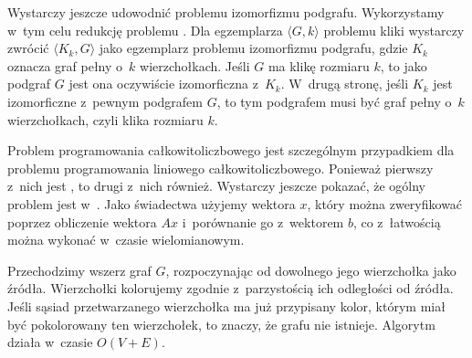 Wystarczy jeszcze udowodnić  problemu izomorfizmu podgrafu.
Wykorzystamy w~tym celu redukcję problemu .
Dla egzemplarza $\langle G,k\rangle$ problemu kliki wystarczy zwrócić $\langle K_k,G\rangle$ jako egzemplarz problemu izomorfizmu podgrafu, gdzie $K_k$ oznacza graf pełny o~$k$ wierzchołkach.
Jeśli $G$ ma klikę rozmiaru $k$, to jako podgraf $G$ jest ona oczywiście izomorficzna z~$K_k$.
W~drugą stronę, jeśli $K_k$ jest izomorficzne z~pewnym podgrafem $G$, to tym podgrafem musi być graf pełny o~$k$ wierzchołkach, czyli klika rozmiaru $k$.

\exercise %
\exercise %
Problem  programowania całkowitoliczbowego jest szczególnym przypadkiem dla problemu programowania liniowego całkowitoliczbowego.
Ponieważ pierwszy z~nich jest , to drugi z~nich również.
Wystarczy jeszcze pokazać, że ogólny problem jest w~\NPclass.
Jako świadectwa użyjemy wektora $x$, który można zweryfikować poprzez obliczenie wektora $Ax$ i~porównanie go z~wektorem $b$, co z~łatwością można wykonać w~czasie wielomianowym.

\exercise %
\exercise %
\exercise %
\exercise %

\exercise %

\problems


\subproblem %
\subproblem %
\subproblem %
\subproblem %


\subproblem %
\subproblem %
\subproblem %
\subproblem %


\subproblem %
Przechodzimy wszerz graf $G$, rozpoczynając od dowolnego jego wierzchołka jako źródła.
Wierzchołki kolorujemy zgodnie z~parzystością ich odległości od źródła.
Jeśli sąsiad przetwarzanego wierzchołka ma już przypisany kolor, którym miał być pokolorowany ten wierzchołek, to znaczy, że  grafu nie istnieje.
Algorytm działa w~czasie $O(V+E)$.

